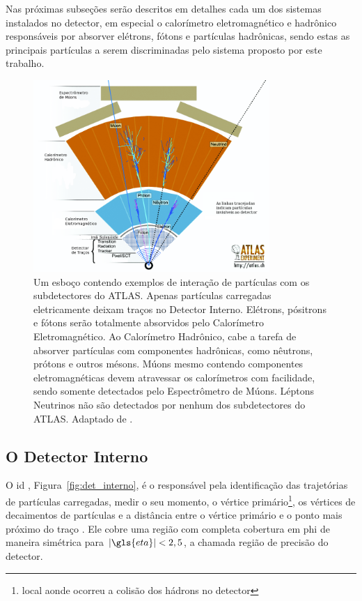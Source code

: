 Nas próximas subseções serão descritos em detalhes cada um dos sistemas instalados no detector, em especial 
o calorímetro eletromagnético e hadrônico responsáveis por absorver elétrons, fótons e partículas hadrônicas,
sendo estas as principais partículas a serem discriminadas pelo sistema proposto por este trabalho.

\begin{figure}[h!t]
\centering
\includegraphics[width=0.8\textwidth]{figures/particulas_subdetectores_3.png}
\caption[Esboço contendo exemplos de interação de partículas com os
subdetectores do ATLAS]
{Um esboço contendo exemplos de interação de partículas com os
subdetectores do ATLAS. 
Apenas partículas carregadas eletricamente deixam traços no Detector Interno. 
Elétrons, pósitrons e fótons serão totalmente absorvidos pelo Calorímetro 
Eletromagnético. Ao Calorímetro Hadrônico, cabe a tarefa de absorver 
partículas com componentes hadrônicas, como nêutrons, prótons e outros mésons. Múons
mesmo contendo componentes eletromagnéticas devem atravessar os calorímetros com
facilidade, sendo somente detectados pelo Espectrômetro de Múons. Léptons Neutrinos não
são detectados por nenhum dos subdetectores do ATLAS. Adaptado de \cite{particulas_atlas}.}
\label{fig:particulas_atlas}
\end{figure}

\newpage


\subsection{O Detector Interno}
\label{ssec:det_int}

O \gls{id} \cite{inner_tdr1,inner_tdr2}, Figura~\ref{fig:det_interno}, é o responsável pela identificação das 
trajetórias de partículas carregadas, medir o seu momento, o
vértice primário\footnote{local aonde ocorreu a colisão dos hádrons no detector}, os
vértices de decaimentos de partículas e a distância entre o vértice primário e o ponto mais próximo do traço
\cite{tese_jatos,ATLAS_TDR}. Ele cobre uma região com completa cobertura em
\gls{phi} de maneira simétrica para $|\gls{eta}| < 2,5$, a chamada região de precisão
do detector.  



